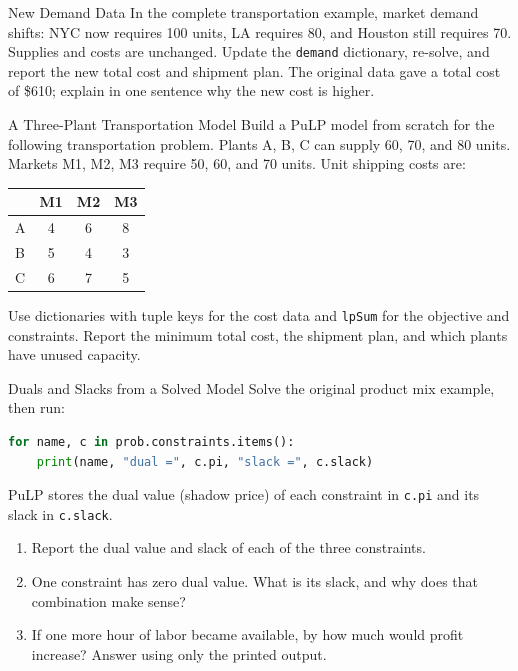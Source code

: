 \begin{ex}{New Demand Data}{}
\label{ex:pulp-transport-data}
In the complete transportation example, market demand shifts: NYC now requires 100 units, LA requires 80, and Houston still requires 70. Supplies and costs are unchanged. Update the \texttt{demand} dictionary, re-solve, and report the new total cost and shipment plan. The original data gave a total cost of \$610; explain in one sentence why the new cost is higher.
\end{ex}


\begin{ex}{A Three-Plant Transportation Model}{}
\label{ex:pulp-transport-model}
Build a PuLP model from scratch for the following transportation problem. Plants A, B, C can supply 60, 70, and 80 units. Markets M1, M2, M3 require 50, 60, and 70 units. Unit shipping costs are:

\begin{center}
\begin{tabular}{l|ccc}
 & M1 & M2 & M3 \\
\hline
A & 4 & 6 & 8 \\
B & 5 & 4 & 3 \\
C & 6 & 7 & 5 \\
\end{tabular}
\end{center}

Use dictionaries with tuple keys for the cost data and \texttt{lpSum} for the objective and constraints. Report the minimum total cost, the shipment plan, and which plants have unused capacity.
\end{ex}

\begin{ex}{Duals and Slacks from a Solved Model}{}
\label{ex:pulp-duals}
Solve the original product mix example, then run:
\begin{lstlisting}[language=Python]
for name, c in prob.constraints.items():
    print(name, "dual =", c.pi, "slack =", c.slack)
\end{lstlisting}
PuLP stores the dual value (shadow price) of each constraint in \texttt{c.pi} and its slack in \texttt{c.slack}.
\begin{enumerate}
\item Report the dual value and slack of each of the three constraints.
\item One constraint has zero dual value. What is its slack, and why does that combination make sense?
\item If one more hour of labor became available, by how much would profit increase? Answer using only the printed output.
\end{enumerate}
\end{ex}


